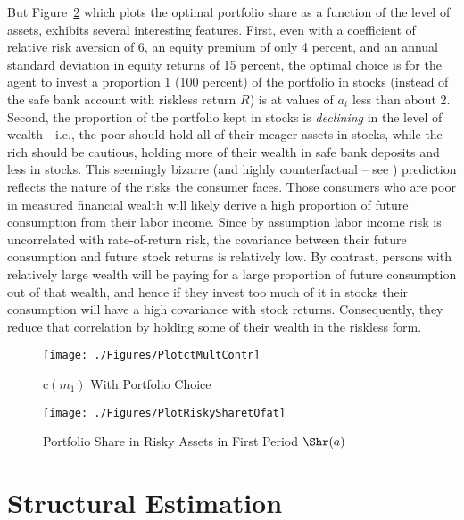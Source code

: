\documentclass[titlepage, headings=optiontotocandhead]{Resources/texmf-local/tex/latex/econtex}
\begin{document}
But Figure~\ref{fig:PlotRiskySharetOfat} which plots the optimal portfolio share as a function of the level of assets, exhibits several interesting features.  First, even with a coefficient of relative risk aversion of 6, an equity premium of only 4 percent, and an annual standard deviation in equity returns of 15 percent, the optimal choice is for the agent to invest a proportion 1 (100 percent) of the portfolio in stocks (instead of the safe bank account with riskless return $R$) is at values of $a_{t}$ less than about 2.  Second, the proportion of the portfolio kept in stocks is \textit{declining} in the level of wealth - i.e., the poor should hold all of their meager assets in stocks, while the rich should be cautious, holding more of their wealth in safe bank deposits and less in stocks.  This seemingly bizarre (and highly counterfactual -- see \cite{carroll:richportfolios}) prediction reflects the nature of the risks the consumer faces.  Those consumers who are poor in measured financial wealth will likely derive a high proportion of future consumption from their labor income.  Since by assumption labor income risk is uncorrelated with rate-of-return risk, the covariance between their future consumption and future stock returns is relatively low.  By contrast, persons with relatively large wealth will be paying for a large proportion of future consumption out of that wealth, and hence if they invest too much of it in stocks their consumption will have a high covariance with stock returns.  Consequently, they reduce that correlation by holding some of their wealth in the riskless form.

\hypertarget{PlotctMultContr}{}
\begin{figure}
  \texttt{[image: ./Figures/PlotctMultContr]}
  \caption{$\mathrm{c}(m_{1})$ With Portfolio Choice}
  \label{fig:PlotctMultContr}
\end{figure}

\hypertarget{PlotRiskySharetOfat}{}
\begin{figure}
  \texttt{[image: ./Figures/PlotRiskySharetOfat]}
  \caption{Portfolio Share in Risky Assets in First Period $\Shr(a)$}
  \label{fig:PlotRiskySharetOfat}
\end{figure}

\hypertarget{structural-estimation}{}
\section{Structural Estimation}\label{sec:structural-estimation}
\end{document}
